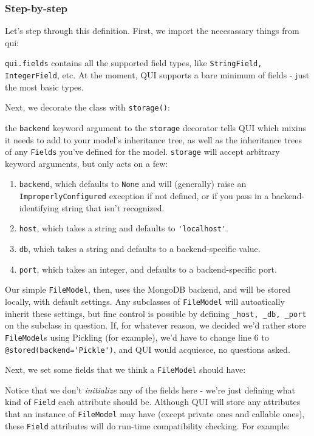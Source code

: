 \documentclass{article} %
\newenvironment{inset}
{
\begin{center}
\begin{minipage}{0.85\textwidth}
}
{
\end{minipage}
\end{center}
}
\newcommand{\il}[1]{\mbox{\lstinline{#1}}}
\newcommand{\lstslice}[3]{
\begin{inset}

\end{inset}
}
\begin{document}
\subsubsection{Step-by-step}
Let's step through this definition. First, we import the necesassary things from qui:
\lstslice{1}{4}{model_definitions.py}
\il{qui.fields} contains all the supported field types, like \il{StringField, IntegerField}, etc. At the moment, QUI supports 
a bare minimum of fields - just the most basic types.

Next, we decorate the class with \il{storage()}:

\lstslice{6}{7}{model_definitions.py}

the \il{backend} keyword argument to the \il{storage} decorator tells QUI which mixins it needs to add to your model's inheritance tree,
as well as the inheritance trees of any \il{Fields} you've defined for the model. \il{storage} will accept arbitrary keyword arguments,
but only acts on a few:
\begin{enumerate}
	\item \il{backend}, which defaults to \il{None} and will (generally) raise an \il{ImproperlyConfigured} exception if not defined, or
	if you pass in a backend-identifying string that isn't recognized.
	\item \il{host}, which takes a string and defaults to \il{'localhost'}.
	\item \il{db}, which takes a string and defaults to a backend-specific value.
	\item \il{port}, which takes an integer, and defaults to a backend-specific port.
\end{enumerate}
Our simple \il{FileModel}, then, uses the MongoDB backend, and will be stored locally, with default settings. Any subclasses of \il{FileModel}
will autoatically inherit these settings, but fine control is possible by defining \il{_host, _db, _port} on the subclass in question. If, for whatever
reason, we decided we'd rather store \il{FileModel}s using Pickling (for example), we'd have to change line 6 to \il{@stored(backend='Pickle')}, 
and QUI would acquiesce, no questions asked.

Next, we set some fields that we think a \il{FileModel} should have:
\lstslice{18}{27}{model_definitions.py}
Notice that we don't \emph{initialize} any of the fields here - we're just defining what kind of \il{Field} each attribute should be.
Although QUI will store any attributes that an instance of \il{FileModel} may have (except private ones and callable ones), these
\il{Field} attributes will do run-time compatibility checking. For example:
\end{document}
